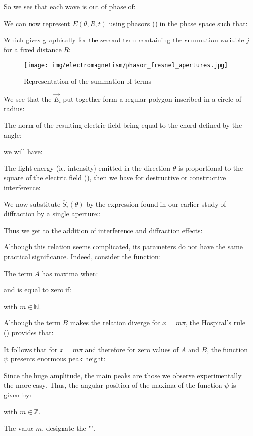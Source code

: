 	So we see that each wave is out of phase of:
	
	We can now represent $E(\theta,R,t)$ using phasors () in the phase space such that:
	
	Which gives graphically for the second term containing the summation variable $j$ for a fixed distance $R$:
	\begin{figure}[H]
		\centering
		\texttt{[image: img/electromagnetism/phasor\_fresnel\_apertures.jpg]}
		\caption[]{Representation of the summation of terms}
	\end{figure}
	We see that the $\vec{E}_i$ put together form a regular polygon inscribed in a circle of radius:
	
	The norm of the resulting electric field being equal to the chord defined by the angle:
	
 	we will have:
	
	The light energy (ie. intensity) emitted in the direction $\theta$ is proportional to the square of the electric field (), then we have for destructive or constructive interference:
	
	We now substitute $\overline{S}_i(\theta)$ by the expression found in our earlier study of diffraction by a single aperture::
	
	Thus we get to the addition of interference and diffraction effects:
	
	Although this relation seems complicated, its parameters do not have the same practical significance. Indeed, consider the function:
	
	The term $A$ has maxima when:
	
	and is equal to zero if:
	
	with $m\in \mathbb{N}$.
	
	Although the term $B$ makes the relation diverge for $x=m\pi$, the Hospital's rule () provides that:
	
	It follows that for $x=m\pi$ and therefore for zero values of $A$ and $B$, the function $\psi$ presents enormous peak height:
	
	Since the huge amplitude, the main peaks are those we observe experimentally the more easy. Thus, the angular position of the maxima of the function $\psi$ is given by:
	
	with $m\in\mathbb{Z}$.

	The value $m$, designate the "".

